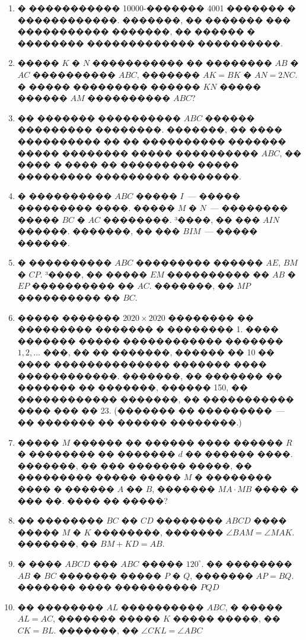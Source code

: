 \documentclass[a4paper,12pt]{article}
\begin{document}
\begin{enumerate}
\item � ����������� 10000-������� 4001 ������� � ������������. �������, �� ������� ��� ����������� �������, �� ������ � �������� ������������� ����������.

\item ����� $K$ � $N$ ����������� �� �������� $AB$ � $AC$ ���������� $ABC$, ������� $AK=BK$ � $AN=2NC$. � ����� ��������� ������ $KN$ ����� ������ $AM$ ���������� $ABC$?

\item �� ������� ���������� $ABC$ ������ ��������� ��������. �������, �� ���� ���������� �� �� ���������� ������� ����� �������� ����� ���������� $ABC$, �� ���� � ���� �� ��������� ����� ��������� ��������� ��������.

\item � ���������� $ABC$ ����� $I$~--- ����� ��������� ����. ����� $M$ � $N$~--- �������� ����� $BC$ � $AC$ ��������. ³����, �� ��� $AIN$ ������. �������, �� ��� $BIM$~--- ����� ������.

\item � ���������� $ABC$ ��������� ������ $AE$, $BM$ � $CP$. ³����, �� ����� $EM$ ���������� �� $AB$ � $EP$ ���������� �� $AC$. �������, �� $MP$ ���������� �� $BC$.

\item ����� ������� $2020\times 2020$ �������� �� ��������� ������� � �������� 1. ���� ������� ����� ������������ ������� $1,2,...$ ���, �� �� �������, ������ �� 10 �� ���� �������������� ������� ���� ������������. �������, �� ������� �� ������� �� �������, ������ 150, �� ������������ �������, �� ����������� ���� ��� �� 23. (������� �� ���������~--- �� ������� �� ������ ��������.)

\item ����� $M$ ������ �� ������ ���� ������ $R$ � �������� �� ������� $d$ �� ������ ����. �������, �� ��� ������� �����, �� ��������� ����� ����� $M$ � �������� ���� � ������ $A$ �� $B$, ������� $MA\cdot MB$ ���� � ��� ��. ���� �� �����?

\item �� �������� $BC$ �� $CD$ �������� $ABCD$ ���� ����� $M$ � $K$ ��������, ������� $\angle BAM =\angle MAK$. �������, �� $BM+KD=AB$.

\item � ���� $ABCD$ ��� $ABC$ ����� $120^{\circ}$. �� �������� $AB$ � $BC$ ������� ����� $P$ � $Q$, ������� $AP=BQ$. ������� ���� ���������� $PQD$

\item �� �������� $AL$ ���������� $ABC$, � ����� $AL=AC$, ������� ����� $K$ ����� �����, �� $CK=BL$. �������, �� $\angle CKL= \angle ABC$


\end{enumerate}
\end{document}
